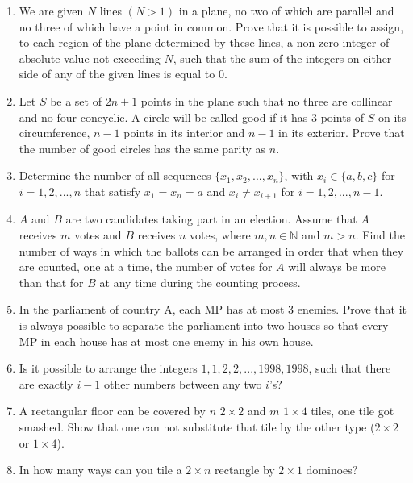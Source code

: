 \documentclass[12pt]{article}
\begin{document}
\begin{enumerate}[resume]
    \item We are given $N$ lines $(N>1)$ in a plane, no two of which are parallel and no three of which have a point in common. Prove that it is possible to assign, to each region of the plane determined by these lines, a non-zero integer of absolute value not exceeding $N$, such that the sum of the integers on either side of any of the given lines is equal to 0.

    \item Let $S$ be a set of $2n+1$ points in the plane such that no three are collinear and no four concyclic. A circle will be called good if it has 3 points of $S$ on its circumference, $n-1$ points in its interior and $n-1$ in its exterior. Prove that the number of good circles has the same parity as $n$.
    

    \item Determine the number of all sequences $\{x_{1},x_{2},...,x_{n}\}$, with $x_{i}\in\{a,b,c\}$ for $i=1,2,...,n$ that satisfy $x_{1}=x_{n}=a$ and $x_{i}\ne x_{i+1}$ for $i=1,2,...,n-1$.

    \item $A$ and $B$ are two candidates taking part in an election. Assume that $A$ receives $m$ votes and $B$ receives $n$ votes, where $m, n\in\mathbb{N}$ and $m>n.$ Find the number of ways in which the ballots can be arranged in order that when they are counted, one at a time, the number of votes for $A$ will always be more than that for $B$ at any time during the counting process.

    \item In the parliament of country A, each MP has at most 3 enemies. Prove that it is always possible to separate the parliament into two houses so that every MP in each house has at most one enemy in his own house.

    \item Is it possible to arrange the integers $1,1,2,2,..., 1998, 1998$, such that there are exactly $i-1$ other numbers between any two $i$'s?

    \item A rectangular floor can be covered by $n$ $2\times2$ and $m$ $1\times4$ tiles, one tile got smashed. Show that one can not substitute that tile by the other type ($2\times2$ or $1\times4$).

    \item In how many ways can you tile a $2\times n$ rectangle by $2\times1$ dominoes?


\end{enumerate}
\end{document}
